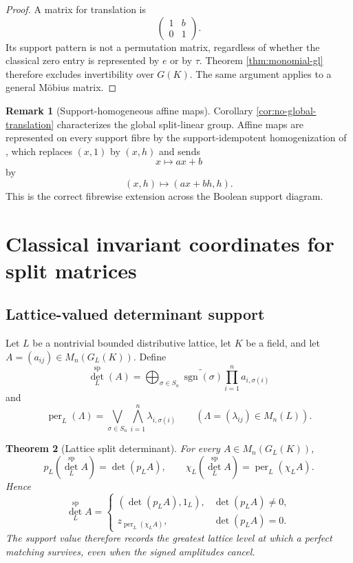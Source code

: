 \documentclass[11pt]{amsart}
\numberwithin{equation}{section}
\newtheorem{theorem}{Theorem}[section]
\theoremstyle{definition}
\newtheorem{remark}[theorem]{Remark}
\newcommand{\perL}{\operatorname{per}_{L}}
\begin{document}
\begin{proof}
A matrix for translation is
\[
\begin{pmatrix}1&b\\0&1\end{pmatrix}.
\]
Its support pattern is not a permutation matrix, regardless of whether the classical zero entry is represented by $e$ or by $\tau$.  Theorem \ref{thm:monomial-gl} therefore excludes invertibility over $G(K)$.  The same argument applies to a general M\"obius matrix.
\end{proof}

\begin{remark}[Support-homogeneous affine maps]
Corollary \ref{cor:no-global-translation} characterizes the global split-linear group.  Affine maps are represented on every support fibre by the support-idempotent homogenization of \cite{Homogenization}, which replaces $(x,1)$ by $(x,h)$ and sends
\[
x\longmapsto ax+b
\]
by
\[
(x,h)\longmapsto(ax+bh,h).
\]
This is the correct fibrewise extension across the Boolean support diagram.
\end{remark}


\section{Classical invariant coordinates for split matrices}
\label{sec:split-matrix-invariants}


\subsection{Lattice-valued determinant support}

Let $L$ be a nontrivial bounded distributive lattice, let $K$ be a field,
and let $A=(a_{ij})\in M_n(G_L(K))$.  Define
\[
\det^{\mathrm{sp}}_L(A)
=\bigoplus_{\sigma\in S_n}
\widetilde{\operatorname{sgn}(\sigma)}
\prod_{i=1}^n a_{i,\sigma(i)}
\]
and
\[
\perL(\Lambda)
=\bigvee_{\sigma\in S_n}\bigwedge_{i=1}^n\lambda_{i,\sigma(i)}
\qquad(\Lambda=(\lambda_{ij})\in M_n(L)).
\]

\begin{theorem}[Lattice split determinant]
\label{thm:lattice-split-determinant}
For every $A\in M_n(G_L(K))$,
\[
\boxed{
p_L(\det^{\mathrm{sp}}_L A)=\det(p_LA),
\qquad
\chi_L(\det^{\mathrm{sp}}_L A)=\perL(\chi_LA).
}
\]
Hence
\[
\det^{\mathrm{sp}}_L A=
\begin{cases}
(\det(p_LA),1_L),&\det(p_LA)\neq0,\\
z_{\perL(\chi_LA)},&\det(p_LA)=0.
\end{cases}
\]
The support value therefore records the greatest lattice level at which a
perfect matching survives, even when the signed amplitudes cancel.
\end{theorem}
\end{document}
